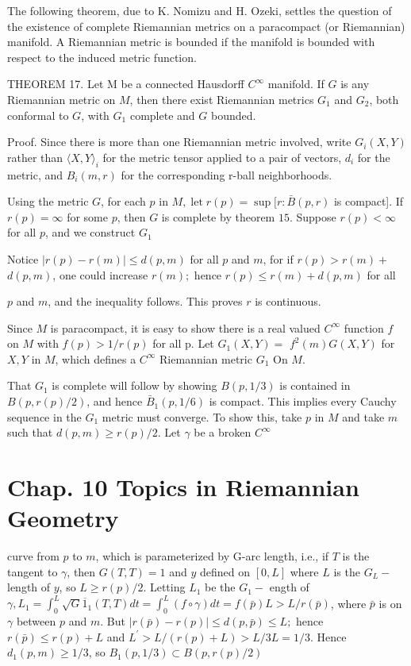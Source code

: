 \documentclass[10pt]{article}
\begin{document}
The following theorem, due to K. Nomizu and $\mathrm{H} .$ Ozeki, settles the question of the existence of complete Riemannian metrics on a paracompact (or Riemannian) manifold. A Riemannian metric is bounded if the manifold is bounded with respect to the induced metric function.

THEOREM 17. Let M be a connected Hausdorff $C^{\infty}$ manifold. If $G$ is any Riemannian metric on $M$, then there exist Riemannian metrics $G_{1}$ and $G_{2}$, both conformal to $G$, with $G_{1}$ complete and $G$ bounded.

Proof. Since there is more than one Riemannian metric involved, write $G_{i}(X, Y)$ rather than $\langle X, Y\rangle_{i}$ for the metric tensor applied to a pair of vectors, $d_{i}$ for the metric, and $B_{i}(m, r)$ for the corresponding r-ball neighborhoods.

Using the metric $G$, for each $p$ in $M, \operatorname{let} r(p)=\sup [r: \bar{B}(p, r)$ is compact]. If $r(p)=\infty$ for some $p$, then $G$ is complete by theorem $15 .$ Suppose $r(p)<\infty$ for all $p$, and we construct $G_{1}$

Notice $|r(p)-r(m)| \leq d(p, m)$ for all $p$ and $m$, for if $r(p)>r(m)+$ $d(p, m)$, one could increase $r(m) ;$ hence $r(p) \leq r(m)+d(p, m)$ for all

$p$ and $m$, and the inequality follows. This proves $r$ is continuous.

Since $M$ is paracompact, it is easy to show there is a real valued $C^{\infty}$ function $f$ on $M$ with $f(p)>1 / r(p)$ for all p. Let $G_{1}(X, Y)=$ $f^{2}(m) G(X, Y)$ for $X, Y$ in $M$, which defines a $C^{\infty}$ Riemannian metric $G_{1}$ On $M .$

That $G_{1}$ is complete will follow by showing $B(p, 1 / 3)$ is contained in $B(p, r(p) / 2)$, and hence $\bar{B}_{1}(p, 1 / 6)$ is compact. This implies every Cauchy sequence in the $G_{1}$ metric must converge. To show this, take $p$ in $M$ and take $m$ such that $d(p, m) \geq r(p) / 2$. Let $\gamma$ be a broken $C^{\infty}$

\section{Chap. 10 Topics in Riemannian Geometry}
curve from $p$ to $m$, which is parameterized by G-arc length, i.e., if $T$ is the tangent to $\gamma$, then $G(T, T)=1$ and $y$ defined on $[0, L]$ where $L$ is the $G_{L}-$ length of $y$, so $L \geq r(p) / 2$. Letting $L_{1}$ be the $G_{1}-$ ength of $\gamma, L_{1}=\int_{0}^{L} \sqrt{G} \overline{1}_{1}(T, T) d t=\int_{0}^{L}(f \circ \gamma) d t=f(\bar{p}) L>L / r(\bar{p})$, where $\bar{p}$ is on $\gamma$ between $p$ and $m .$ But $|r(\bar{p})-r(p)| \leq d(p, \bar{p}) \leq L ;$ hence $r(\bar{p}) \leq r(p)+L$ and $L^{\prime}>L /(r(p)+L)>L / 3 L=1 / 3$. Hence $d_{1}(p, m) \geq 1 / 3$, so $B_{1}(p, 1 / 3) \subset B(p, r(p) / 2)$
\end{document}
